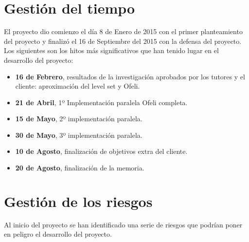\section{Gesti\'{o}n del tiempo}

El proyecto dio comienzo el d\'{i}a 8 de Enero de 2015 con el primer planteamiento del proyecto y finaliz\'{o} el 16 de Septiembre del 2015 con la defensa del proyecto. Los siguientes son los hitos m\'{a}s significativos que han tenido lugar en el desarrollo del proyecto:

\begin{itemize}
	\item \textbf{16 de Febrero},  resultados de la investigaci\'{o}n aprobados por los tutores y el cliente: aproximaci\'{o}n del level set y Ofeli.
	\item \textbf{21 de Abril}, 1º Implementaci\'{o}n paralela Ofeli completa.
	\item \textbf{15 de Mayo}, 2º implementaci\'{o}n paralela.
	\item \textbf{30 de Mayo}, 3º implementaci\'{o}n paralela.
	\item \textbf{10 de Agosto}, finalizaci\'{o}n de objetivos extra del cliente.
	\item \textbf{20 de Agosto}, finalizaci\'{o}n de la memoria.
\end{itemize}




\section{Gesti\'{o}n de los riesgos}\label{riesgos}

Al inicio del proyecto se han identificado una serie de riesgos que podr\'{i}an poner en peligro el desarrollo del proyecto.

